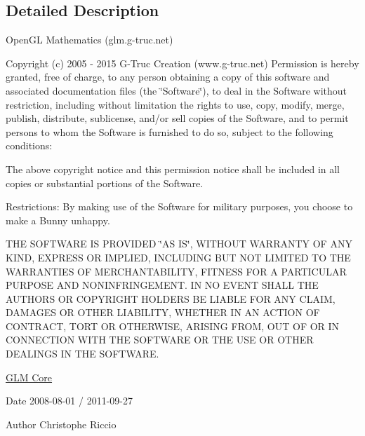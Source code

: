 \subsection{Detailed Description}
Open\-G\-L Mathematics (glm.\-g-\/truc.\-net)

Copyright (c) 2005 -\/ 2015 G-\/\-Truc Creation (www.\-g-\/truc.\-net) Permission is hereby granted, free of charge, to any person obtaining a copy of this software and associated documentation files (the \char`\"{}\-Software\char`\"{}), to deal in the Software without restriction, including without limitation the rights to use, copy, modify, merge, publish, distribute, sublicense, and/or sell copies of the Software, and to permit persons to whom the Software is furnished to do so, subject to the following conditions\-:

The above copyright notice and this permission notice shall be included in all copies or substantial portions of the Software.

Restrictions\-: By making use of the Software for military purposes, you choose to make a Bunny unhappy.

T\-H\-E S\-O\-F\-T\-W\-A\-R\-E I\-S P\-R\-O\-V\-I\-D\-E\-D \char`\"{}\-A\-S I\-S\char`\"{}, W\-I\-T\-H\-O\-U\-T W\-A\-R\-R\-A\-N\-T\-Y O\-F A\-N\-Y K\-I\-N\-D, E\-X\-P\-R\-E\-S\-S O\-R I\-M\-P\-L\-I\-E\-D, I\-N\-C\-L\-U\-D\-I\-N\-G B\-U\-T N\-O\-T L\-I\-M\-I\-T\-E\-D T\-O T\-H\-E W\-A\-R\-R\-A\-N\-T\-I\-E\-S O\-F M\-E\-R\-C\-H\-A\-N\-T\-A\-B\-I\-L\-I\-T\-Y, F\-I\-T\-N\-E\-S\-S F\-O\-R A P\-A\-R\-T\-I\-C\-U\-L\-A\-R P\-U\-R\-P\-O\-S\-E A\-N\-D N\-O\-N\-I\-N\-F\-R\-I\-N\-G\-E\-M\-E\-N\-T. I\-N N\-O E\-V\-E\-N\-T S\-H\-A\-L\-L T\-H\-E A\-U\-T\-H\-O\-R\-S O\-R C\-O\-P\-Y\-R\-I\-G\-H\-T H\-O\-L\-D\-E\-R\-S B\-E L\-I\-A\-B\-L\-E F\-O\-R A\-N\-Y C\-L\-A\-I\-M, D\-A\-M\-A\-G\-E\-S O\-R O\-T\-H\-E\-R L\-I\-A\-B\-I\-L\-I\-T\-Y, W\-H\-E\-T\-H\-E\-R I\-N A\-N A\-C\-T\-I\-O\-N O\-F C\-O\-N\-T\-R\-A\-C\-T, T\-O\-R\-T O\-R O\-T\-H\-E\-R\-W\-I\-S\-E, A\-R\-I\-S\-I\-N\-G F\-R\-O\-M, O\-U\-T O\-F O\-R I\-N C\-O\-N\-N\-E\-C\-T\-I\-O\-N W\-I\-T\-H T\-H\-E S\-O\-F\-T\-W\-A\-R\-E O\-R T\-H\-E U\-S\-E O\-R O\-T\-H\-E\-R D\-E\-A\-L\-I\-N\-G\-S I\-N T\-H\-E S\-O\-F\-T\-W\-A\-R\-E.

\hyperlink{group__core}{G\-L\-M Core}

\begin{DoxyDate}{Date}
2008-\/08-\/01 / 2011-\/09-\/27 
\end{DoxyDate}
\begin{DoxyAuthor}{Author}
Christophe Riccio 
\end{DoxyAuthor}
